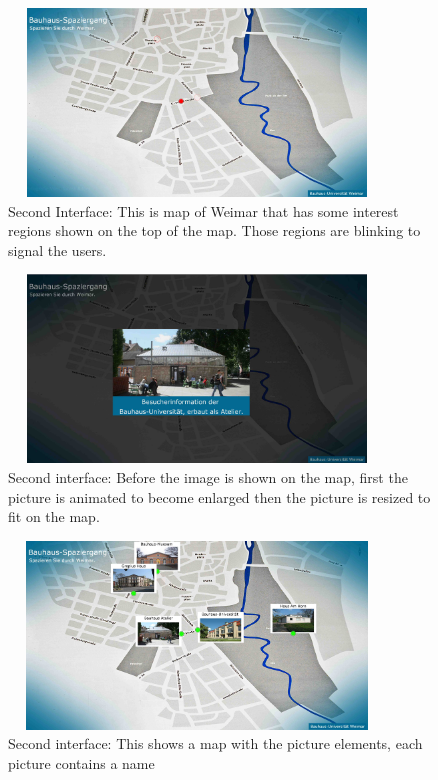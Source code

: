 \begin{figure}[H]
    \centering
    \includegraphics[width=100mm,height=50mm]{Figures/7/map}
    \caption{Second Interface: This is map of Weimar that has some interest regions shown on the top of the map. Those regions are blinking to signal the users.}%
    \label{fig:adSecondpage1}%
\end{figure}


\begin{figure}[H]
    \centering
    \includegraphics[width=100mm,height=50mm]{Figures/7/enlarged_pic}
    \caption{Second interface: Before the image is shown on the map, first the picture is animated to become enlarged then the picture is resized to fit on the map.}%
    \label{fig:adSecondpage2}%
\end{figure}


\begin{figure}[H]
    \centering
    \includegraphics[width=100mm,height=50mm]{Figures/7/map_pictures}
    \caption{Second interface: This shows a map with the picture elements, each picture contains a name}%
    \label{fig:adSecondpage3}%
\end{figure}

